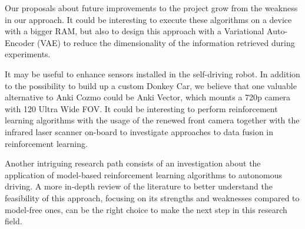 \documentclass[10pt,twocolumn,letterpaper]{article}
\begin{document}
Our proposals about future improvements to the project grow from the weakness in our approach.
It could be interesting to execute these algorithms on a device with a bigger RAM, but also to design this approach with a Variational Auto-Encoder (VAE) to reduce the dimensionality of the information retrieved during experiments.

It may be useful to enhance sensors installed in the self-driving robot.
In addition to the possibility to build up a custom Donkey Car, we believe that one valuable alternative to Anki Cozmo could be Anki Vector, which mounts a 720p camera with 120 Ultra Wide FOV.
It could be interesting to perform reinforcement learning algorithms with the usage of the renewed front camera together with the infrared laser scanner on-board to investigate approaches to data fusion in reinforcement learning.

Another intriguing research path consists of an investigation about the application of model-based reinforcement learning algorithms to autonomous driving.
A more in-depth review of the literature to better understand the feasibility of this approach, focusing on its strengths and weaknesses compared to model-free ones, can be the right choice to make the next step in this research field.

    {\footnotesize
        
        
    }
\end{document}
